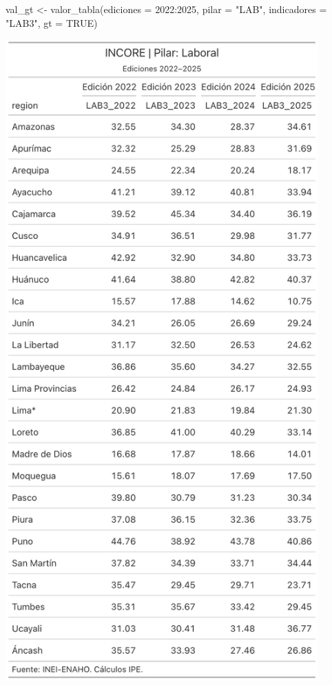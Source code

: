 \documentclass[
  11pt,
  letterpaper,
  DIV=11,
  numbers=noendperiod]{scrartcl}
\newenvironment{Shaded}{\begin{snugshade}}{\end{snugshade}}
\newcommand{\AttributeTok}[1]{\textcolor[rgb]{0.40,0.45,0.13}{#1}}
\newcommand{\ConstantTok}[1]{\textcolor[rgb]{0.56,0.35,0.01}{#1}}
\newcommand{\DecValTok}[1]{\textcolor[rgb]{0.68,0.00,0.00}{#1}}
\newcommand{\FunctionTok}[1]{\textcolor[rgb]{0.28,0.35,0.67}{#1}}
\newcommand{\NormalTok}[1]{\textcolor[rgb]{0.00,0.23,0.31}{#1}}
\newcommand{\OtherTok}[1]{\textcolor[rgb]{0.00,0.23,0.31}{#1}}
\newcommand{\SpecialCharTok}[1]{\textcolor[rgb]{0.37,0.37,0.37}{#1}}
\newcommand{\StringTok}[1]{\textcolor[rgb]{0.13,0.47,0.30}{#1}}
\begin{document}
\begin{Shaded}
\begin{Highlighting}[]
\NormalTok{val\_gt }\OtherTok{\textless{}{-}} \FunctionTok{valor\_tabla}\NormalTok{(}\AttributeTok{ediciones =} \DecValTok{2022}\SpecialCharTok{:}\DecValTok{2025}\NormalTok{, }
                      \AttributeTok{pilar =} \StringTok{"LAB"}\NormalTok{, }
                      \AttributeTok{indicadores =} \StringTok{"LAB3"}\NormalTok{,}
                      \AttributeTok{gt =} \ConstantTok{TRUE}\NormalTok{)}
\end{Highlighting}
\end{Shaded}

\begin{center}
\includegraphics[width=0.9\textwidth,height=\textheight]{vuru.png}
\end{center}
\end{document}
